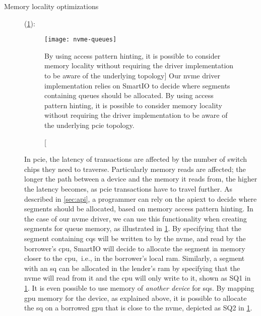 \begin{description}
    \item[Memory locality optimizations] (\cref{fig:nvme-queues}):
        \begin{figure}
            \centering
            \texttt{[image: nvme-queues]}
            \caption
            [By using access pattern hinting, it is possible to consider memory locality without requiring the driver implementation to be aware of the underlying  topology]
            {Our \gls{nvme} driver implementation relies on SmartIO to decide where \glspl{segment} containing queues should be allocated. By using access pattern hinting, it is possible to consider memory locality without requiring the driver implementation to be aware of the underlying \gls{pcie} topology.}
            \label{fig:nvme-queues}
        \end{figure}
        In \gls{pcie}, the latency of transactions are affected by the number of switch chips they need to traverse.
        Particularly memory reads are affected; the longer the path between a device and the memory it reads from, the higher the latency becomes, as \gls{pcie} transactions have to travel further.
        As described in \cref{sec:api}, a programmer can rely on the \gls{apiext} to decide where \glspl{segment} should be allocated, based on memory access pattern hinting.
        In the case of our \gls{nvme} driver, we can use this functionality when creating \glspl{segment} for queue memory, as illustrated in \cref{fig:nvme-queues}.
        By specifying that the \gls{segment} containing \glspl{cq} will be written to by the \gls{nvme}, and read by the \gls{borrower}'s \gls{cpu}, SmartIO will decide to allocate the \gls{segment} in memory closer to the \gls{cpu},~i.e., in the \gls{borrower}'s local \gls{ram}.
        Similarly, a segment with an \gls{sq} can be allocated in the \gls{lender}'s \gls{ram} by specifying that the \gls{nvme} will read from it and the \gls{cpu} will only write to it, shown as SQ1 in \cref{fig:nvme-queues}.
        It is even possible to use memory of \emph{another device} for \glspl{sq}.
        By mapping \gls{gpu} memory for the device, as explained above, it is possible to allocate the \gls{sq} on a borrowed \gls{gpu} that is close to the \gls{nvme}, depicted as SQ2 in \cref{fig:nvme-queues}.


\end{description}
